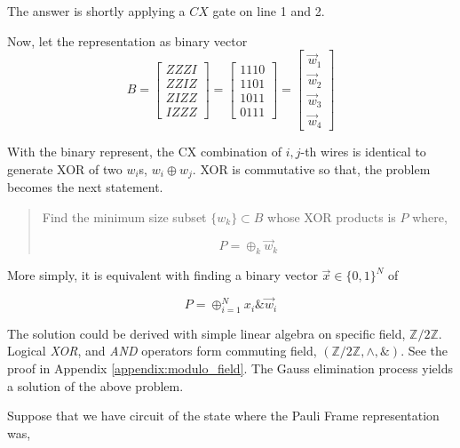 \documentclass[a4paper,12pt]{article}
\begin{document}
The answer is shortly applying a $CX$ gate on line 1 and 2.

Now, let the representation as binary vector
\begin{equation}
B = \begin{bmatrix}
    ZZZI\\
    ZZIZ\\
    ZIZZ\\
    IZZZ
\end{bmatrix} = \begin{bmatrix}
    1110\\
    1101\\
    1011\\
    0111
\end{bmatrix} = 
\begin{bmatrix}
    \vec{w}_1\\
    \vec{w}_2\\
    \vec{w}_3\\
    \vec{w}_4
\end{bmatrix}
\end{equation}

With the binary represent, 
the CX combination of $i, j$-th wires is identical to generate XOR of two $w_i$s, 
$w_i \oplus w_j$.
XOR is commutative so that, the problem becomes the next statement.

\begin{quotation}
    Find the minimum size subset $\{w_k\} \subset B$ whose XOR products is $P$
    where,

    \begin{equation*}
        P = \oplus_{k} \vec{w}_k 
    \end{equation*}

\end{quotation}

More simply, it is equivalent with finding a binary vector $\vec{x} \in \{0, 1\}^N$ of 

\begin{equation}
    P = \oplus_{i=1}^N x_i \& \vec{w}_i
\end{equation}

The solution could be derived with simple linear algebra on specific field, $\mathbb{Z}/2\mathbb{Z}$.
Logical \textit{XOR}, and \textit{AND} operators form commuting field, $(\mathbb{Z}/2\mathbb{Z} ,\wedge , \&)$.
See the proof in Appendix \ref{appendix:modulo_field}. 
The Gauss elimination process yields a solution of the above problem.

Suppose that we have circuit of the state where the Pauli Frame representation was,
\end{document}
